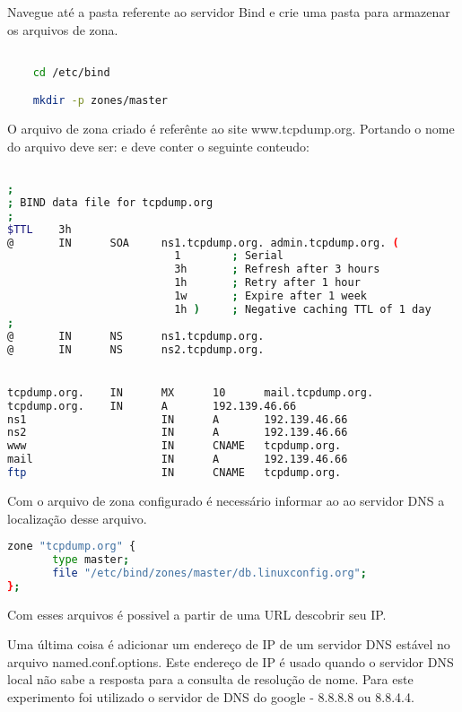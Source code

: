 \documentclass[a4paper]{report} %
\begin{document}
Navegue até a pasta referente ao servidor Bind e crie uma pasta para armazenar os arquivos de zona.

\begin{lstlisting}[language=bash]

	cd /etc/bind

	mkdir -p zones/master

\end{lstlisting}

O arquivo de zona criado é referênte ao site www.tcpdump.org. Portando o nome do arquivo deve ser:  e deve conter o seguinte conteudo:

\begin{lstlisting}[language=bash]

;
; BIND data file for tcpdump.org
;
$TTL    3h
@       IN      SOA     ns1.tcpdump.org. admin.tcpdump.org. (
                          1        ; Serial
                          3h       ; Refresh after 3 hours
                          1h       ; Retry after 1 hour
                          1w       ; Expire after 1 week
                          1h )     ; Negative caching TTL of 1 day
;
@       IN      NS      ns1.tcpdump.org.
@       IN      NS      ns2.tcpdump.org.


tcpdump.org.    IN      MX      10      mail.tcpdump.org.
tcpdump.org.    IN      A       192.139.46.66
ns1                     IN      A       192.139.46.66
ns2                     IN      A       192.139.46.66
www                     IN      CNAME   tcpdump.org.
mail                    IN      A       192.139.46.66
ftp                     IN      CNAME   tcpdump.org.

\end{lstlisting}

Com o arquivo de zona configurado é necessário informar ao ao servidor DNS a localização desse arquivo.

\begin{lstlisting}[language=bash]
zone "tcpdump.org" {
       type master;
       file "/etc/bind/zones/master/db.linuxconfig.org";
};
\end{lstlisting}

Com esses arquivos é possivel a partir de uma URL descobrir seu IP.

Uma última coisa é adicionar um endereço de IP de um servidor DNS estável no arquivo named.conf.options. Este endereço de IP é usado quando o servidor DNS local não sabe a resposta para a consulta de resolução de nome. Para este experimento foi utilizado o servidor de DNS do google - 8.8.8.8 ou 8.8.4.4.
\end{document}

